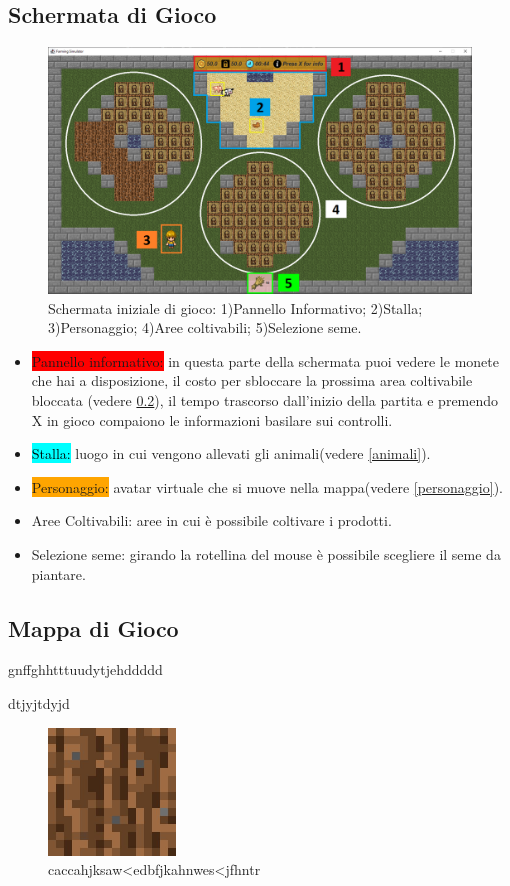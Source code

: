 \documentclass[a4paper,12pt]{report}
\begin{document}
\subsection{Schermata di Gioco}
\begin{figure}[!htb]
	\centerline{\includegraphics[width=\textwidth]{img/SchermataPrincipale.png}}
	\caption{Schermata iniziale di gioco: 1)Pannello Informativo; 2)Stalla; 3)Personaggio; 4)Aree coltivabili; 5)Selezione seme. }
	\label{img:schermata}
\end{figure}
\begin{itemize}
	\item[1)] \colorbox{red}{Pannello informativo:} in questa parte della schermata puoi vedere le monete che hai a disposizione, il costo per sbloccare la prossima area coltivabile bloccata (vedere \cref{mappa}), il tempo trascorso dall'inizio della partita e premendo X in gioco compaiono le informazioni basilare sui controlli.
	\item[2)] \colorbox{cyan}{\textcolor{black}{Stalla:}} luogo in cui vengono allevati gli animali(vedere \cref{animali}).
	\item[3)] \colorbox{orange}{Personaggio:} avatar virtuale che si muove nella mappa(vedere \cref{personaggio}).
	\item[4)] Aree Coltivabili: aree in cui è possibile coltivare i prodotti.
	\item[5)] Selezione seme: girando la rotellina del mouse è possibile scegliere il seme da piantare.
\end{itemize}
\subsection{Mappa di Gioco}
		\label{mappa}
		gnffghhtttuudytjehddddd
		
		dtjyjtdyjd
	\begin{figure} 
		\includegraphics[scale=0.5]{img/farmland.png}
		\caption{caccahjksaw<edbfjkahnwes<jfhntr}
	\end{figure}
\end{document}
